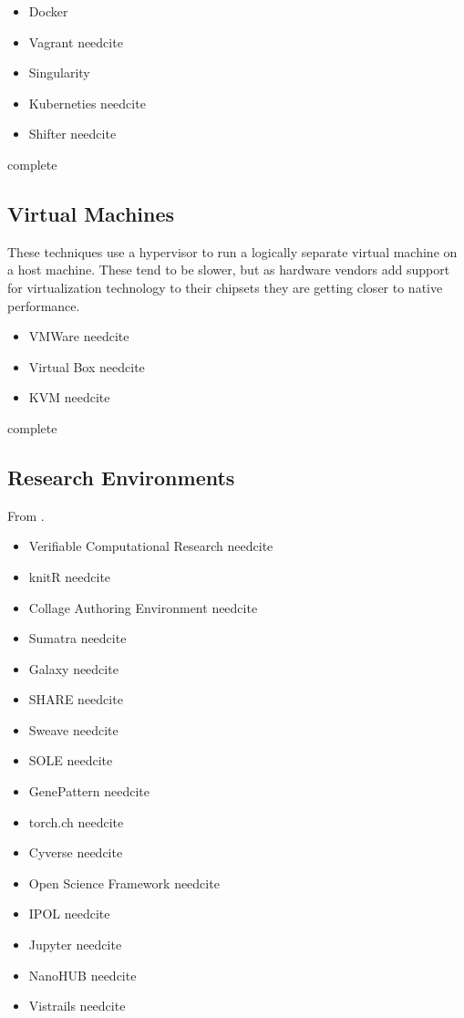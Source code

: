 \documentclass{article}
\newcommand{\complete}{
	\gls{complete}
}
\newcommand{\needcite}{
	\gls{needcite}
}
\begin{document}
\begin{itemize}
\item Docker \cite{Docker}
\item Vagrant \needcite
\item Singularity \cite{Singularity}
\item Kuberneties \needcite
\item Shifter \needcite
\end{itemize}

\complete

\subsection{Virtual Machines}

These techniques use a hypervisor to run a logically separate virtual machine on a host machine. These tend to be slower, but as hardware vendors add support for virtualization technology to their chipsets they are getting closer to native performance.

\begin{itemize}
\item VMWare \needcite
\item Virtual Box \needcite
\item KVM \needcite
\end{itemize}

\complete

\subsection{Research Environments}

From \cite{stodden-sharing-reproducibility-talk-2017}.

\begin{itemize}
\item Verifiable Computational Research \needcite
\item knitR \needcite
\item Collage Authoring Environment \needcite
\item Sumatra \needcite
\item Galaxy \needcite
\item SHARE \needcite
\item Sweave \needcite
\item SOLE \needcite
\item GenePattern \needcite
\item torch.ch \needcite
\item Cyverse \needcite
\item Open Science Framework \needcite
\item IPOL \needcite
\item Jupyter \needcite
\item NanoHUB \needcite
\item Vistrails \needcite
\end{itemize}
\end{document}
